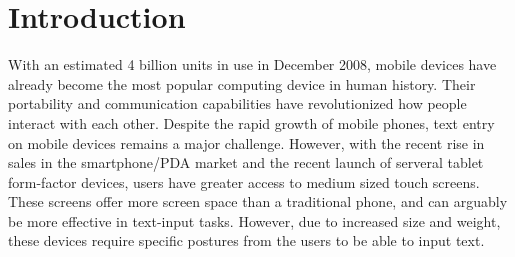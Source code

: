 \section{Introduction}

With an estimated 4 billion units in use in December 2008, mobile
devices have already become the most popular computing device in human
history. Their portability and communication capabilities have
revolutionized how people interact with each other. Despite the rapid
growth of mobile phones, text entry on mobile devices remains a major
challenge. However, with the recent rise in sales in the
smartphone/PDA market and the recent launch of serveral tablet
form-factor devices, users have greater access to medium sized touch
screens. These screens offer more screen space than a traditional
phone, and can arguably be more effective in text-input
tasks. However, due to increased size and weight, these devices
require specific postures from the users to be able to input text.

